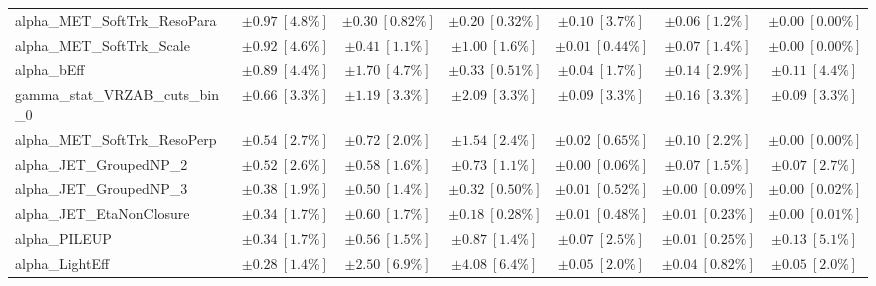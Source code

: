 \begin{sidewaystable}
\begin{center}
\begin{tabular*}{\textwidth}{@{\extracolsep{\fill}}lcccccc}
alpha\_MET\_SoftTrk\_ResoPara         & $\pm 0.97\ [4.8\%] $          & $\pm 0.30\ [0.82\%] $          & $\pm 0.20\ [0.32\%] $          & $\pm 0.10\ [3.7\%] $          & $\pm 0.06\ [1.2\%] $          & $\pm 0.00\ [0.00\%] $       \\
alpha\_MET\_SoftTrk\_Scale         & $\pm 0.92\ [4.6\%] $          & $\pm 0.41\ [1.1\%] $          & $\pm 1.00\ [1.6\%] $          & $\pm 0.01\ [0.44\%] $          & $\pm 0.07\ [1.4\%] $          & $\pm 0.00\ [0.00\%] $       \\
alpha\_bEff         & $\pm 0.89\ [4.4\%] $          & $\pm 1.70\ [4.7\%] $          & $\pm 0.33\ [0.51\%] $          & $\pm 0.04\ [1.7\%] $          & $\pm 0.14\ [2.9\%] $          & $\pm 0.11\ [4.4\%] $       \\
gamma\_stat\_VRZAB\_cuts\_bin\_0         & $\pm 0.66\ [3.3\%] $          & $\pm 1.19\ [3.3\%] $          & $\pm 2.09\ [3.3\%] $          & $\pm 0.09\ [3.3\%] $          & $\pm 0.16\ [3.3\%] $          & $\pm 0.09\ [3.3\%] $       \\
alpha\_MET\_SoftTrk\_ResoPerp         & $\pm 0.54\ [2.7\%] $          & $\pm 0.72\ [2.0\%] $          & $\pm 1.54\ [2.4\%] $          & $\pm 0.02\ [0.65\%] $          & $\pm 0.10\ [2.2\%] $          & $\pm 0.00\ [0.00\%] $       \\
alpha\_JET\_GroupedNP\_2         & $\pm 0.52\ [2.6\%] $          & $\pm 0.58\ [1.6\%] $          & $\pm 0.73\ [1.1\%] $          & $\pm 0.00\ [0.06\%] $          & $\pm 0.07\ [1.5\%] $          & $\pm 0.07\ [2.7\%] $       \\
alpha\_JET\_GroupedNP\_3         & $\pm 0.38\ [1.9\%] $          & $\pm 0.50\ [1.4\%] $          & $\pm 0.32\ [0.50\%] $          & $\pm 0.01\ [0.52\%] $          & $\pm 0.00\ [0.09\%] $          & $\pm 0.00\ [0.02\%] $       \\
alpha\_JET\_EtaNonClosure         & $\pm 0.34\ [1.7\%] $          & $\pm 0.60\ [1.7\%] $          & $\pm 0.18\ [0.28\%] $          & $\pm 0.01\ [0.48\%] $          & $\pm 0.01\ [0.23\%] $          & $\pm 0.00\ [0.01\%] $       \\
alpha\_PILEUP         & $\pm 0.34\ [1.7\%] $          & $\pm 0.56\ [1.5\%] $          & $\pm 0.87\ [1.4\%] $          & $\pm 0.07\ [2.5\%] $          & $\pm 0.01\ [0.25\%] $          & $\pm 0.13\ [5.1\%] $       \\
alpha\_LightEff         & $\pm 0.28\ [1.4\%] $          & $\pm 2.50\ [6.9\%] $          & $\pm 4.08\ [6.4\%] $          & $\pm 0.05\ [2.0\%] $          & $\pm 0.04\ [0.82\%] $          & $\pm 0.05\ [2.0\%] $       \\

\end{tabular*}
\end{center}
\end{sidewaystable}
